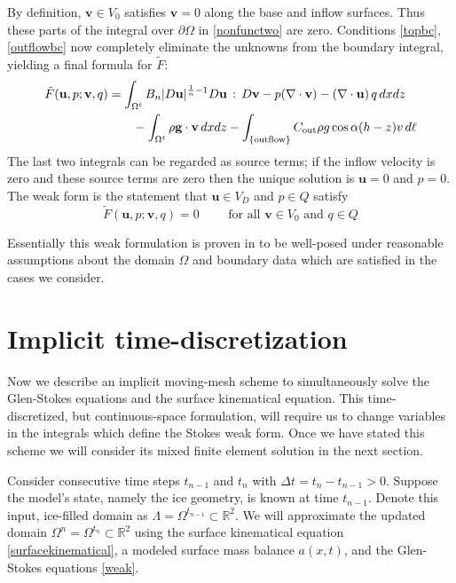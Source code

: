 \documentclass[letterpaper,final,12pt,reqno]{amsart}
\newcommand{\RR}{\mathbb{R}}
\newcommand{\bu}{\mathbf{u}}
\newcommand{\bv}{\mathbf{v}}
\begin{document}
By definition, $\bv\in V_0$ satisfies $\bv=0$ along the base and inflow surfaces.  Thus these parts of the integral over $\partial\Omega$ in \eqref{nonfunctwo} are zero.  Conditions \eqref{topbc}, \eqref{outflowbc} now completely eliminate the unknowns from the boundary integral, yielding a final formula for $\tilde F$:
\begin{align}
\tilde F(\bu,p;\bv,q) &= \int_{\Omega^t} B_n |D\bu|^{\frac{1}{n} - 1} D\bu\,:\,D\bv - p (\nabla \cdot \bv) - \left(\nabla \cdot \bu\right) q \,dx dz \label{defineF} \\
    &\qquad  - \int_{\Omega^t} \rho \mathbf{g} \cdot \bv \,dx dz - \int_{\{\text{outflow}\}} C_{\text{out}} \rho g \cos\alpha (h-z) v \,d\ell \notag
\end{align}
The last two integrals can be regarded as source terms; if the inflow velocity is zero and these source terms are zero then the unique solution is $\bu=0$ and $p=0$.  The weak form is the statement that $\bu\in V_D$ and $p\in Q$ satisfy
\begin{equation}
\tilde F(\bu,p;\bv,q) = 0 \qquad \text{ for all } \bv\in V_0 \text{ and } q\in Q  \label{weak}
\end{equation}

Essentially this weak formulation is proven in \cite[Theorem 3.8]{JouvetRappaz2011} to be well-posed under reasonable assumptions about the domain $\Omega$ and boundary data which are satisfied in the cases we consider.


\section{Implicit time-discretization} \label{sec:implicitstep}

Now we describe an implicit moving-mesh scheme to simultaneously solve the Glen-Stokes equations and the surface kinematical equation.  This time-discretized, but continuous-space formulation, will require us to change variables in the integrals which define the Stokes weak form.  Once we have stated this scheme we will consider its mixed finite element solution in the next section.

Consider consecutive time steps $t_{n-1}$ and $t_n$ with $\Delta t = t_n - t_{n-1} > 0$.  Suppose the model's state, namely the ice geometry, is known at time $t_{n-1}$.  Denote this input, ice-filled domain as $\Lambda = \Omega^{t_{n-1}} \subset \RR^2$.  We will approximate the updated domain $\Omega^n = \Omega^{t_n} \subset \RR^2$ using the surface kinematical equation \eqref{surfacekinematical}, a modeled surface mass balance $a(x,t)$, and the Glen-Stokes equations \eqref{weak}.
\end{document}
